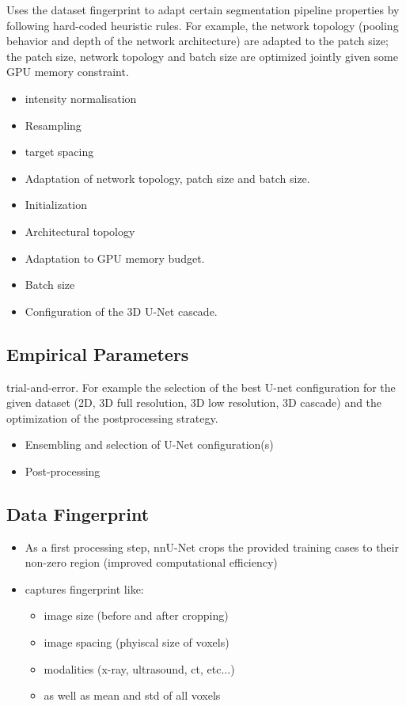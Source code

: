 \documentclass[11pt]{article}
\begin{document}
Uses the dataset fingerprint to adapt certain segmentation pipeline properties by following hard-coded heuristic rules. For example, the network topology (pooling behavior and depth of the network architecture) are adapted to the patch size; the patch size, network topology and batch size are optimized jointly given some GPU memory constraint.

\begin{itemize}
    \item intensity normalisation
    \item Resampling
    \item target spacing
    \item Adaptation of network topology, patch size and batch size.
    \item Initialization
    \item Architectural topology
    \item Adaptation to GPU memory budget.
    \item Batch size
    \item Configuration of the 3D U-Net cascade.
\end{itemize}

\subsection{Empirical Parameters}

trial-and-error. For example the selection of the best U-net configuration for the given dataset (2D, 3D full resolution, 3D low resolution, 3D cascade) and the optimization of the postprocessing strategy.

\begin{itemize}
    \item Ensembling and selection of U-Net configuration(s)
    \item Post-processing
\end{itemize}

\subsection{Data Fingerprint}

\begin{itemize}
    \item As a first processing step, nnU-Net crops the provided training cases to their non-zero region (improved computational efficiency)
    \item captures fingerprint like: \begin{itemize}
        \item image size (before and after cropping)
        \item image spacing (phyiscal size of voxels)
        \item modalities (x-ray, ultrasound, ct, etc...)
        \item as well as mean and std of all voxels
    \end{itemize}
\end{itemize}

\printbibliography
\end{document}
